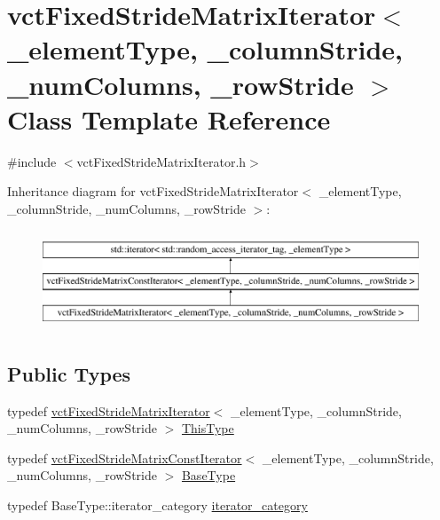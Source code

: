 \hypertarget{classvct_fixed_stride_matrix_iterator}{}\section{vct\+Fixed\+Stride\+Matrix\+Iterator$<$ \+\_\+element\+Type, \+\_\+column\+Stride, \+\_\+num\+Columns, \+\_\+row\+Stride $>$ Class Template Reference}
\label{classvct_fixed_stride_matrix_iterator}


{\ttfamily \#include $<$vct\+Fixed\+Stride\+Matrix\+Iterator.\+h$>$}

Inheritance diagram for vct\+Fixed\+Stride\+Matrix\+Iterator$<$ \+\_\+element\+Type, \+\_\+column\+Stride, \+\_\+num\+Columns, \+\_\+row\+Stride $>$\+:\begin{figure}[H]
\begin{center}
\leavevmode
\includegraphics[height=3.000000cm]{d9/d4f/classvct_fixed_stride_matrix_iterator}
\end{center}
\end{figure}
\subsection*{Public Types}
\begin{DoxyCompactItemize}
\item 
typedef \hyperlink{classvct_fixed_stride_matrix_iterator}{vct\+Fixed\+Stride\+Matrix\+Iterator}$<$ \+\_\+element\+Type, \+\_\+column\+Stride, \+\_\+num\+Columns, \+\_\+row\+Stride $>$ \hyperlink{classvct_fixed_stride_matrix_iterator_a99a6088a50b066ba920c9138d7b3a950}{This\+Type}
\item 
typedef \hyperlink{classvct_fixed_stride_matrix_const_iterator}{vct\+Fixed\+Stride\+Matrix\+Const\+Iterator}$<$ \+\_\+element\+Type, \+\_\+column\+Stride, \+\_\+num\+Columns, \+\_\+row\+Stride $>$ \hyperlink{classvct_fixed_stride_matrix_iterator_a9711a47a94c8d65a5f91c5064914f326}{Base\+Type}
\item 
typedef Base\+Type\+::iterator\+\_\+category \hyperlink{classvct_fixed_stride_matrix_iterator_aa33a65dee36b4ac1f9fb5479ce074742}{iterator\+\_\+category}
\end{DoxyCompactItemize}

